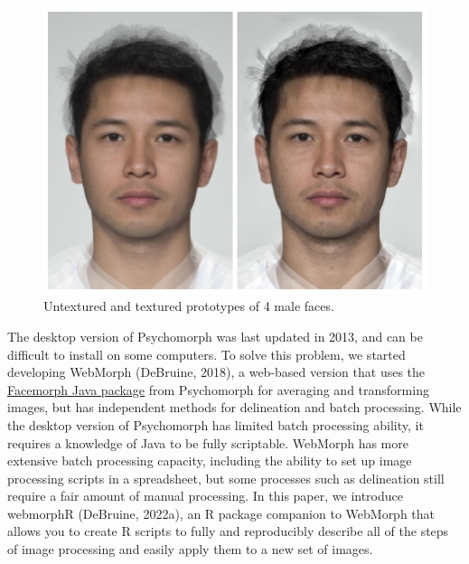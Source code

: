 \documentclass[
  doc,floatsintext]{apa6}
\begin{document}
\begin{figure}
\includegraphics[width=1\linewidth]{index_files/figure-latex/texture-comp-1} \caption{Untextured and textured prototypes of 4 male faces.}\label{fig:texture-comp}
\end{figure}

The desktop version of Psychomorph was last updated in 2013, and can be difficult to install on some computers. To solve this problem, we started developing WebMorph (DeBruine, 2018), a web-based version that uses the \href{https://users.aber.ac.uk/bpt/jpsychomorph/version6/javadoc/}{Facemorph Java package} from Psychomorph for averaging and transforming images, but has independent methods for delineation and batch processing. While the desktop version of Psychomorph has limited batch processing ability, it requires a knowledge of Java to be fully scriptable. WebMorph has more extensive batch processing capacity, including the ability to set up image processing scripts in a spreadsheet, but some processes such as delineation still require a fair amount of manual processing. In this paper, we introduce webmorphR (DeBruine, 2022a), an R package companion to WebMorph that allows you to create R scripts to fully and reproducibly describe all of the steps of image processing and easily apply them to a new set of images.
\end{document}
